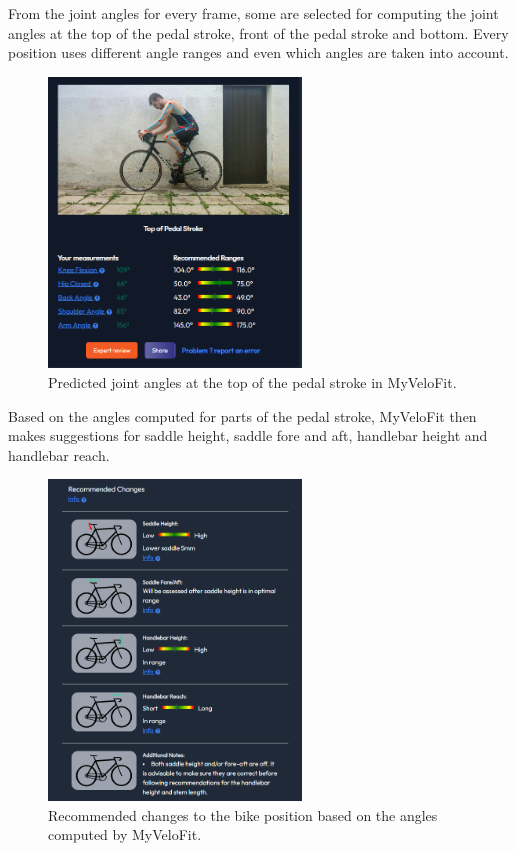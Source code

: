 From the joint angles for every frame, some are selected for computing the joint angles at the top of the pedal stroke, front of the pedal stroke and bottom. Every position uses different angle ranges and even which angles are taken into account.

\begin{figure}[htbp]
    \centering
    \includegraphics[width=0.6\textwidth]{obrazky-figures/myvelofit_top.png}
    \caption{Predicted joint angles at the top of the pedal stroke in MyVeloFit.}
    \label{fig:myvelofit_top}
\end{figure}

Based on the angles computed for parts of the pedal stroke, MyVeloFit then makes suggestions for saddle height, saddle fore and aft, handlebar height and handlebar reach.

\begin{figure}[htbp]
    \centering
    \includegraphics[width=0.6\textwidth]{obrazky-figures/myvelofit_suggestions.png}
    \caption{Recommended changes to the bike position based on the angles computed by MyVeloFit.}
    \label{fig:myvelofit_suggestions}
\end{figure}

